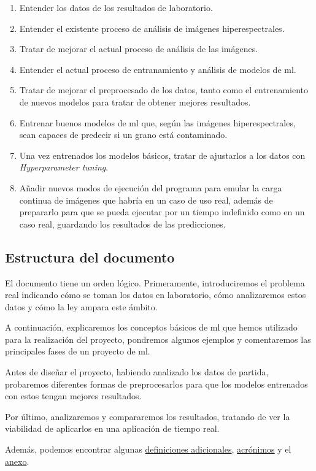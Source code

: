 \begin{enumerate}
    \item Entender los datos de los resultados de laboratorio.
    \item Entender el existente proceso de análisis de imágenes hiperespectrales.
    \item Tratar de mejorar el actual proceso de análisis de las imágenes.
    \item Entender el actual proceso de entranamiento y análisis de modelos de \gls{ml}.
    \item Tratar de mejorar el preprocesado de los datos, tanto como el entrenamiento de nuevos modelos para tratar de obtener mejores resultados.
    \item Entrenar buenos modelos de \gls{ml} que, según las imágenes hiperespectrales, sean capaces de predecir si un grano está contaminado. 
    \item Una vez entrenados los modelos básicos, tratar de ajustarlos a los datos con \textit{Hyperparameter tuning}.
    \item Añadir nuevos modos de ejecución del programa para emular la carga continua de imágenes que habría en un caso de uso real, además de prepararlo para que se pueda ejecutar por un tiempo indefinido como en un caso real, guardando los resultados de las predicciones.
\end{enumerate}

\subsection{Estructura del documento}

El documento tiene un orden lógico. Primeramente, introduciremos el problema real indicando cómo se toman los datos en laboratorio, cómo analizaremos estos datos y cómo la ley ampara este ámbito. 

A continuación, explicaremos los conceptos básicos de \gls{ml} que hemos utilizado para la realización del proyecto, pondremos algunos ejemplos y comentaremos las principales fases de un proyecto de \gls{ml}. 

Antes de diseñar el proyecto, habiendo analizado los datos de partida, probaremos diferentes formas de preprocesarlos para que los modelos entrenados con estos tengan mejores resultados. 

Por último, analizaremos y compararemos los resultados, tratando de ver la viabilidad de aplicarlos en una aplicación de tiempo real.

Además, podemos encontrar algunas \hyperref[sec:additional-definitions]{definiciones adicionales}, \hyperref[sec:acronyms]{acrónimos} y el \hyperref[sec:anex]{anexo}.